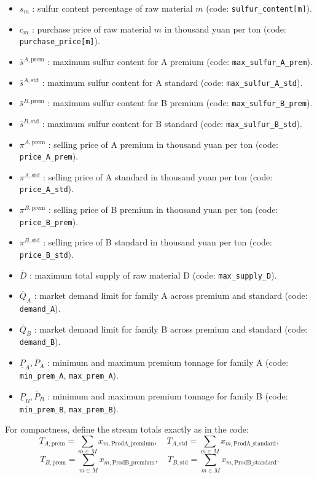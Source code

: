 \begin{itemize}
    \item $s_m$ : sulfur content percentage of raw material $m$ (code: \texttt{sulfur\_content[m]}).
    \item $c_m$ : purchase price of raw material $m$ in thousand yuan per ton (code: \texttt{purchase\_price[m]}).
    \item $\bar{s}^{A,\mathrm{prem}}$ : maximum sulfur content for A premium (code: \texttt{max\_sulfur\_A\_prem}).
    \item $\bar{s}^{A,\mathrm{std}}$ : maximum sulfur content for A standard (code: \texttt{max\_sulfur\_A\_std}).
    \item $\bar{s}^{B,\mathrm{prem}}$ : maximum sulfur content for B premium (code: \texttt{max\_sulfur\_B\_prem}).
    \item $\bar{s}^{B,\mathrm{std}}$ : maximum sulfur content for B standard (code: \texttt{max\_sulfur\_B\_std}).
    \item $\pi^{A,\mathrm{prem}}$ : selling price of A premium in thousand yuan per ton (code: \texttt{price\_A\_prem}).
    \item $\pi^{A,\mathrm{std}}$ : selling price of A standard in thousand yuan per ton (code: \texttt{price\_A\_std}).
    \item $\pi^{B,\mathrm{prem}}$ : selling price of B premium in thousand yuan per ton (code: \texttt{price\_B\_prem}).
    \item $\pi^{B,\mathrm{std}}$ : selling price of B standard in thousand yuan per ton (code: \texttt{price\_B\_std}).
    \item $\bar{D}$ : maximum total supply of raw material D (code: \texttt{max\_supply\_D}).
    \item $\bar{Q}_A$ : market demand limit for family A across premium and standard (code: \texttt{demand\_A}).
    \item $\bar{Q}_B$ : market demand limit for family B across premium and standard (code: \texttt{demand\_B}).
    \item $\underline{P}_A,\overline{P}_A$ : minimum and maximum premium tonnage for family A (code: \texttt{min\_prem\_A}, \texttt{max\_prem\_A}).
    \item $\underline{P}_B,\overline{P}_B$ : minimum and maximum premium tonnage for family B (code: \texttt{min\_prem\_B}, \texttt{max\_prem\_B}).
\end{itemize}

For compactness, define the stream totals exactly as in the code:
\[
T_{A,\mathrm{prem}}=\sum_{m\in M} x_{m,\mathrm{ProdA\_premium}},\quad
T_{A,\mathrm{std}}=\sum_{m\in M} x_{m,\mathrm{ProdA\_standard}},
\]
\[
T_{B,\mathrm{prem}}=\sum_{m\in M} x_{m,\mathrm{ProdB\_premium}},\quad
T_{B,\mathrm{std}}=\sum_{m\in M} x_{m,\mathrm{ProdB\_standard}}.
\]

